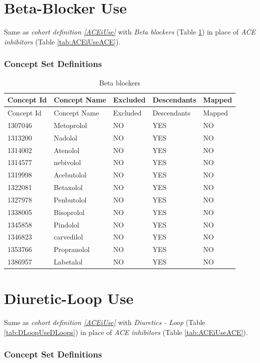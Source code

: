 \documentclass[11pt]{book}
\theoremstyle{definition}
\theoremstyle{definition}
\theoremstyle{definition}
\theoremstyle{remark}
\begin{document}
\section{Beta-Blocker Use}\label{BBUse}

Same as \emph{cohort definition \ref{ACEiUse}} with \emph{Beta blockers}
(Table \ref{tab:BBUseBB}) in place of \emph{ACE inhibitors} (Table
\ref{tab:ACEiUseACE}).

\subsubsection*{Concept Set
Definitions}\label{concept-set-definitions-11}

\begin{longtable}[]{@{}lllll@{}}
\caption{\label{tab:BBUseBB} Beta blockers}\tabularnewline
\toprule
Concept Id & Concept Name & Excluded & Descendants &
Mapped\tabularnewline
\midrule
\endfirsthead
\toprule
Concept Id & Concept Name & Excluded & Descendants &
Mapped\tabularnewline
\midrule
\endhead
1307046 & Metoprolol & NO & YES & NO\tabularnewline
1313200 & Nadolol & NO & YES & NO\tabularnewline
1314002 & Atenolol & NO & YES & NO\tabularnewline
1314577 & nebivolol & NO & YES & NO\tabularnewline
1319998 & Acebutolol & NO & YES & NO\tabularnewline
1322081 & Betaxolol & NO & YES & NO\tabularnewline
1327978 & Penbutolol & NO & YES & NO\tabularnewline
1338005 & Bisoprolol & NO & YES & NO\tabularnewline
1345858 & Pindolol & NO & YES & NO\tabularnewline
1346823 & carvedilol & NO & YES & NO\tabularnewline
1353766 & Propranolol & NO & YES & NO\tabularnewline
1386957 & Labetalol & NO & YES & NO\tabularnewline
\bottomrule
\end{longtable}

\section{Diuretic-Loop Use}\label{DLoopUse}

Same as \emph{cohort definition \ref{ACEiUse}} with \emph{Diuretics -
Loop} (Table \ref{tab:DLoopUseDLoops}) in place of \emph{ACE inhibitors}
(Table \ref{tab:ACEiUseACE}).

\subsubsection*{Concept Set
Definitions}\label{concept-set-definitions-12}
\end{document}
